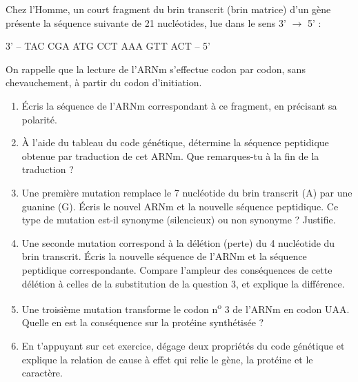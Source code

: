 \documentclass[11pt]{article}
\begin{document}
\begin{exercice}
Chez l'Homme, un court fragment du brin transcrit (brin matrice) d'un gène présente la séquence suivante de 21 nucléotides, lue dans le sens 3' $\rightarrow$ 5' :
\begin{center}
3' -- TAC CGA ATG CCT AAA GTT ACT -- 5'
\end{center}
On rappelle que la lecture de l'ARNm s'effectue codon par codon, sans chevauchement, à partir du codon d'initiation.

\begin{enumerate}
\item Écris la séquence de l'ARNm correspondant à ce fragment, en précisant sa polarité.
\item À l'aide du tableau du code génétique, détermine la séquence peptidique obtenue par traduction de cet ARNm. Que remarques-tu à la fin de la traduction ?
\item Une première mutation remplace le 7 nucléotide du brin transcrit (A) par une guanine (G). Écris le nouvel ARNm et la nouvelle séquence peptidique. Ce type de mutation est-il synonyme (silencieux) ou non synonyme ? Justifie.
\item Une seconde mutation correspond à la délétion (perte) du 4 nucléotide du brin transcrit. Écris la nouvelle séquence de l'ARNm et la séquence peptidique correspondante. Compare l'ampleur des conséquences de cette délétion à celles de la substitution de la question 3, et explique la différence.
\item Une troisième mutation transforme le codon n\textsuperscript{o} 3 de l'ARNm en codon UAA. Quelle en est la conséquence sur la protéine synthétisée ?
\item En t'appuyant sur cet exercice, dégage deux propriétés du code génétique et explique la relation de cause à effet qui relie le gène, la protéine et le caractère.
\end{enumerate}
\end{exercice}
\end{document}
